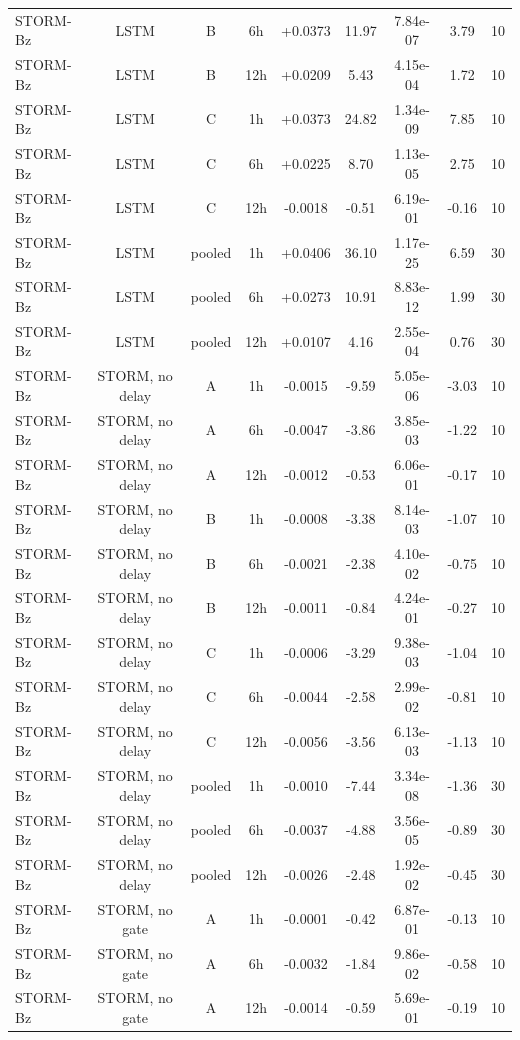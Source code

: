 \begin{tabular}{lcccccccc}
STORM-Bz & LSTM & B & 6h & +0.0373 & 11.97 & 7.84e-07 & 3.79 & 10 \\
STORM-Bz & LSTM & B & 12h & +0.0209 & 5.43 & 4.15e-04 & 1.72 & 10 \\
STORM-Bz & LSTM & C & 1h & +0.0373 & 24.82 & 1.34e-09 & 7.85 & 10 \\
STORM-Bz & LSTM & C & 6h & +0.0225 & 8.70 & 1.13e-05 & 2.75 & 10 \\
STORM-Bz & LSTM & C & 12h & -0.0018 & -0.51 & 6.19e-01 & -0.16 & 10 \\
STORM-Bz & LSTM & pooled & 1h & +0.0406 & 36.10 & 1.17e-25 & 6.59 & 30 \\
STORM-Bz & LSTM & pooled & 6h & +0.0273 & 10.91 & 8.83e-12 & 1.99 & 30 \\
STORM-Bz & LSTM & pooled & 12h & +0.0107 & 4.16 & 2.55e-04 & 0.76 & 30 \\
STORM-Bz & STORM, no delay & A & 1h & -0.0015 & -9.59 & 5.05e-06 & -3.03 & 10 \\
STORM-Bz & STORM, no delay & A & 6h & -0.0047 & -3.86 & 3.85e-03 & -1.22 & 10 \\
STORM-Bz & STORM, no delay & A & 12h & -0.0012 & -0.53 & 6.06e-01 & -0.17 & 10 \\
STORM-Bz & STORM, no delay & B & 1h & -0.0008 & -3.38 & 8.14e-03 & -1.07 & 10 \\
STORM-Bz & STORM, no delay & B & 6h & -0.0021 & -2.38 & 4.10e-02 & -0.75 & 10 \\
STORM-Bz & STORM, no delay & B & 12h & -0.0011 & -0.84 & 4.24e-01 & -0.27 & 10 \\
STORM-Bz & STORM, no delay & C & 1h & -0.0006 & -3.29 & 9.38e-03 & -1.04 & 10 \\
STORM-Bz & STORM, no delay & C & 6h & -0.0044 & -2.58 & 2.99e-02 & -0.81 & 10 \\
STORM-Bz & STORM, no delay & C & 12h & -0.0056 & -3.56 & 6.13e-03 & -1.13 & 10 \\
STORM-Bz & STORM, no delay & pooled & 1h & -0.0010 & -7.44 & 3.34e-08 & -1.36 & 30 \\
STORM-Bz & STORM, no delay & pooled & 6h & -0.0037 & -4.88 & 3.56e-05 & -0.89 & 30 \\
STORM-Bz & STORM, no delay & pooled & 12h & -0.0026 & -2.48 & 1.92e-02 & -0.45 & 30 \\
STORM-Bz & STORM, no gate & A & 1h & -0.0001 & -0.42 & 6.87e-01 & -0.13 & 10 \\
STORM-Bz & STORM, no gate & A & 6h & -0.0032 & -1.84 & 9.86e-02 & -0.58 & 10 \\
STORM-Bz & STORM, no gate & A & 12h & -0.0014 & -0.59 & 5.69e-01 & -0.19 & 10 \\

\end{tabular}
